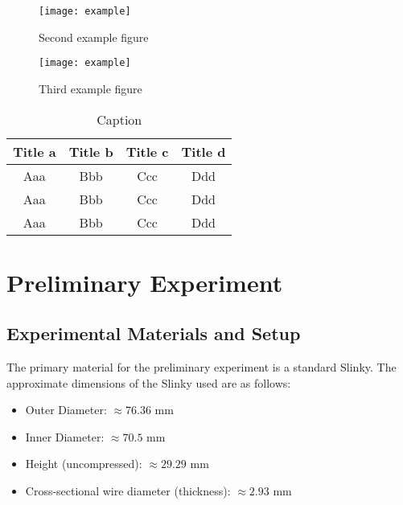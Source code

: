 \documentclass{mcmthesis}  %
\begin{document}
\begin{figure}[h]  %
\centering  %
\begin{minipage}[c]{0.48\textwidth}  %
\centering  %
\texttt{[image: example]}  %
\caption{Second example figure} \label{fig:example2}  %
\end{minipage}  %
\hspace{0.02\textwidth}
\begin{minipage}[c]{0.48\textwidth}  %
\centering  %
\texttt{[image: example]}  %
\caption{Third example figure} \label{fig:example3}  %
\end{minipage}  %
\end{figure}  %

\begin{table}[!t]  %
\caption{Caption}  %
\label{tab1}  %
\tabcolsep 42pt %
\begin{tabular*}{\textwidth}{cccc}  %
\toprule  %
Title a & Title b & Title c & Title d \\
\midrule  %
Aaa & Bbb & Ccc & Ddd \\
Aaa & Bbb & Ccc & Ddd \\
Aaa & Bbb & Ccc & Ddd \\
\bottomrule  %
\end{tabular*}  %
\end{table}  %

\section{Preliminary Experiment} %

\subsection{Experimental Materials and Setup} %
The primary material for the preliminary experiment is a standard Slinky. The approximate dimensions of the Slinky used are as follows:
\begin{itemize}
    \item Outer Diameter: \(\approx 76.36\) mm
    \item Inner Diameter: \(\approx 70.5\) mm
    \item Height (uncompressed): \(\approx 29.29\) mm
    \item Cross-sectional wire diameter (thickness): \(\approx 2.93\) mm
\end{itemize}
\end{document}
